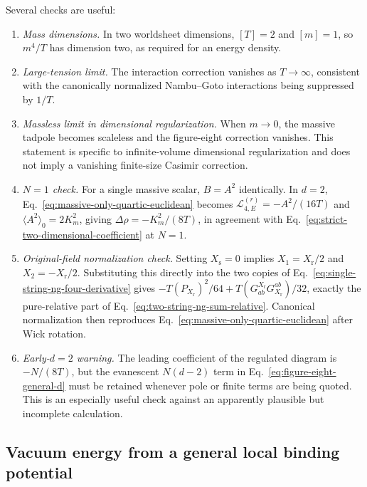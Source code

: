 Several checks are useful:
\begin{enumerate}
  \item \textit{Mass dimensions.}
  In two worldsheet dimensions, $[T]=2$ and $[m]=1$, so
  $m^4/T$ has dimension two, as required for an energy density.

  \item \textit{Large-tension limit.}
  The interaction correction vanishes as $T\to\infty$, consistent with the
  canonically normalized Nambu--Goto interactions being suppressed by $1/T$.

  \item \textit{Massless limit in dimensional regularization.}
  When $m\to0$, the massive tadpole becomes scaleless and the figure-eight
  correction vanishes.  This statement is specific to infinite-volume
  dimensional regularization and does not imply a vanishing finite-size
  Casimir correction.

  \item \textit{$N=1$ check.}
  For a single massive scalar, $B=A^2$ identically.  In $d=2$,
  Eq.~\eqref{eq:massive-only-quartic-euclidean} becomes
  $\mathcal L_{4,E}^{(r)}=-A^2/(16T)$ and
  $\langle A^2\rangle_0=2K_m^2$, giving
  $\Delta\rho=-K_m^2/(8T)$, in agreement with
  Eq.~\eqref{eq:strict-two-dimensional-coefficient} at $N=1$.

  \item \textit{Original-field normalization check.}
  Setting $X_{\mathrm s}=0$ implies $X_1=X_{\mathrm r}/2$ and
  $X_2=-X_{\mathrm r}/2$.  Substituting this directly into the two copies of
  Eq.~\eqref{eq:single-string-ng-four-derivative} gives
  $-T(P_{X_{\mathrm r}})^2/64
   +T(G^{X_{\mathrm r}}_{ab}G_{X_{\mathrm r}}^{ab})/32$,
  exactly the pure-relative part of
  Eq.~\eqref{eq:two-string-ng-sum-relative}.  Canonical normalization then
  reproduces Eq.~\eqref{eq:massive-only-quartic-euclidean} after Wick rotation.

  \item \textit{Early-$d=2$ warning.}
  The leading coefficient of the regulated diagram is $-N/(8T)$, but the
  evanescent $N(d-2)$ term in Eq.~\eqref{eq:figure-eight-general-d} must be
  retained whenever pole or finite terms are being quoted.  This is an
  especially useful check against an apparently plausible but incomplete
  calculation.
\end{enumerate}

\subsection{Vacuum energy from a general local binding potential}
\label{subsec:general-binding-potential}

